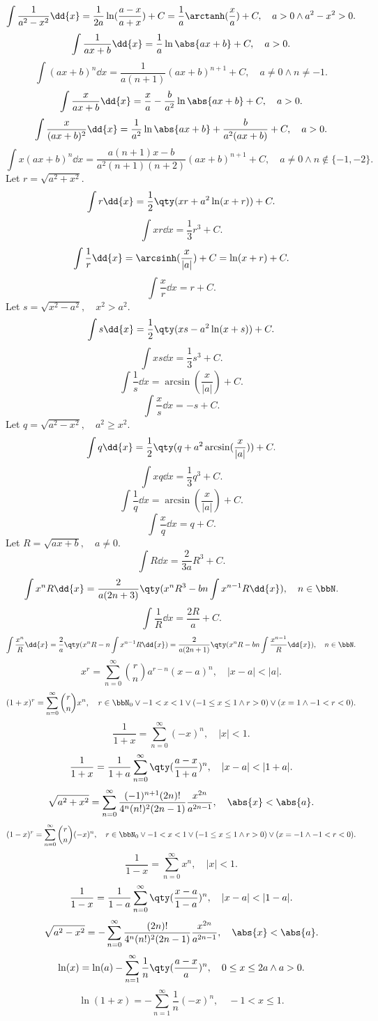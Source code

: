 \documentclass[a4paper,12pt]{article}
\begin{document}
\[\int\frac{1}{a^2-x^2}\dd{x}=\frac{1}{2a}\ln(\frac{a-x}{a+x})+C=\frac{1}{a}\arctanh(\frac{x}{a})+C,\quad a>0\land a^2-x^2>0.\]
\[\int\frac{1}{ax+b}\dd{x}=\frac{1}{a}\ln\abs{ax+b}+C,\quad a>0.\]
\[\int(ax+b)^n\dd{x}=\frac{1}{a(n+1)}(ax+b)^{n+1}+C,\quad a\neq 0\land n\neq -1.\]
\[\int\frac{x}{ax+b}\dd{x}=\frac{x}{a}-\frac{b}{a^2}\ln\abs{ax+b}+C,\quad a>0.\]
\[\int\frac{x}{(ax+b)^2}\dd{x}=\frac{1}{a^2}\ln\abs{ax+b}+\frac{b}{a^2(ax+b)}+C,\quad a>0.\]
\[\int x(ax+b)^n\dd{x}=\frac{a(n+1)x-b}{a^2(n+1)(n+2)}(ax+b)^{n+1}+C,\quad a\neq 0\land n\notin\{-1,-2\}.\]
Let $r=\sqrt{a^2+x^2}$.
\[\int r\dd{x}=\frac{1}{2}\qty(xr+a^2\ln(x+r))+C.\]
\[\int xr\dd{x}=\frac{1}{3}r^3+C.\]
\[\int\frac{1}{r}\dd{x}=\arcsinh(\frac{x}{|a|})+C=\ln(x+r)+C.\]
\[\int\frac{x}{r}\dd{x}=r+C.\]
Let $s=\sqrt{x^2-a^2},\quad x^2>a^2$.
\[\int s\dd{x}=\frac{1}{2}\qty(xs-a^2\ln(x+s))+C.\]
\[\int xs\dd{x}=\frac{1}{3}s^3+C.\]
\[\int\frac{1}{s}\dd{x}=\arcsin(\frac{x}{|a|})+C.\]
\[\int\frac{x}{s}\dd{x}=-s+C.\]
Let $q=\sqrt{a^2-x^2},\quad a^2\geq x^2$.
\[\int q\dd{x}=\frac{1}{2}\qty(q+a^2\arcsin(\frac{x}{|a|}))+C.\]
\[\int xq\dd{x}=\frac{1}{3}q^3+C.\]
\[\int\frac{1}{q}\dd{x}=\arcsin(\frac{x}{|a|})+C.\]
\[\int\frac{x}{q}\dd{x}=q+C.\]
Let $R=\sqrt{ax+b},\quad a\neq 0$.
\[\int R\dd{x}=\frac{2}{3a}R^3+C.\]
\[\int x^nR\dd{x}=\frac{2}{a(2n+3)}\qty(x^nR^3-bn\int x^{n-1}R\dd{x}),\quad n\in\bbN.\]
\[\int\frac{1}{R}\dd{x}=\frac{2R}{a}+C.\]
\[\int\frac{x^n}{R}\dd{x}=\frac{2}{a}\qty(x^nR-n\int x^{n-1}R\dd{x})=\frac{2}{a(2n+1)}\qty(x^nR-bn\int\frac{x^{n-1}}{R}\dd{x}),\quad n\in\bbN.\]
\[x^r=\sum_{n=0}^{\infty}\binom{r}{n}a^{r-n}(x-a)^n,\quad |x-a|<|a|.\]
\[(1+x)^r=\sum_{n=0}^{\infty}\binom{r}{n}x^n,\quad r\in\bbN_0\lor-1<x<1\lor(-1\le x\le1\land r>0)\lor(x=1\land-1<r<0).\]
\[\frac{1}{1+x}=\sum_{n=0}^{\infty}(-x)^n,\quad |x|<1.\]
\[\frac{1}{1+x}=\frac{1}{1+a}\sum_{n=0}^{\infty}\qty(\frac{a-x}{1+a})^n,\quad |x-a|<|1+a|.\]
\[\sqrt{a^2+x^2}=\sum_{n=0}^{\infty}\frac{(-1)^{n+1}(2n)!}{4^n(n!)^2(2n-1)}\frac{x^{2n}}{a^{2n-1}},\quad\abs{x}<\abs{a}.\]
\[(1-x)^r=\sum_{n=0}^{\infty}\binom{r}{n}(-x)^n,\quad r\in\bbN_0\lor-1<x<1\lor(-1\le x\le1\land r>0)\lor(x=-1\land-1<r<0).\]
\[\frac{1}{1-x}=\sum_{n=0}^{\infty}x^n,\quad |x|<1.\]
\[\frac{1}{1-x}=\frac{1}{1-a}\sum_{n=0}^{\infty}\qty(\frac{x-a}{1-a})^n,\quad |x-a|<|1-a|.\]
\[\sqrt{a^2-x^2}=-\sum_{n=0}^{\infty}\frac{(2n)!}{4^n(n!)^2(2n-1)}\frac{x^{2n}}{a^{2n-1}},\quad\abs{x}<\abs{a}.\]
\[\ln(x)=\ln(a)-\sum_{n=1}^{\infty}\frac{1}{n}\qty(\frac{a-x}{a})^n,\quad 0\le x\le 2a\land a>0.\]
\[\ln(1+x)=-\sum_{n=1}^{\infty}\frac{1}{n}(-x)^n,\quad -1<x\le 1.\]
\end{document}
